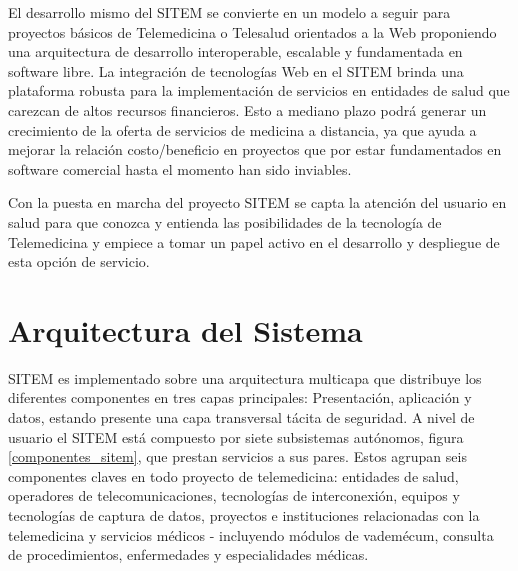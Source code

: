 El desarrollo mismo del SITEM se convierte en un modelo a seguir para proyectos básicos de Telemedicina o Telesalud orientados a la Web proponiendo una arquitectura de desarrollo interoperable, escalable y fundamentada en software libre. La integración de tecnologías Web en el SITEM brinda una plataforma robusta para la implementación de servicios en entidades de salud que carezcan de altos recursos financieros. Esto a mediano plazo podrá generar un crecimiento de la oferta de servicios de medicina a distancia\cite{itu}\cite{craig2005}, ya que ayuda a mejorar la relación costo/beneficio en proyectos que por estar fundamentados en software comercial hasta el momento han sido inviables. 

Con la puesta en marcha del proyecto SITEM se capta la atención del usuario en salud para que conozca y entienda las posibilidades de la tecnología de Telemedicina y empiece a tomar un papel activo en el desarrollo y despliegue de esta opción de servicio.

\section{Arquitectura del Sistema}

SITEM es implementado sobre una arquitectura multicapa que distribuye los diferentes componentes en tres capas principales: Presentación, aplicación y datos, estando presente una capa transversal tácita de seguridad. A nivel de usuario el SITEM está compuesto por siete subsistemas autónomos, figura \ref{componentes_sitem}, que prestan servicios a sus pares. Estos agrupan seis componentes claves en todo proyecto de telemedicina: entidades de salud, operadores de telecomunicaciones, tecnologías de interconexión, equipos y tecnologías de captura de datos, proyectos e instituciones relacionadas con la telemedicina y servicios médicos - incluyendo módulos de vademécum, consulta de procedimientos, enfermedades y especialidades médicas.

